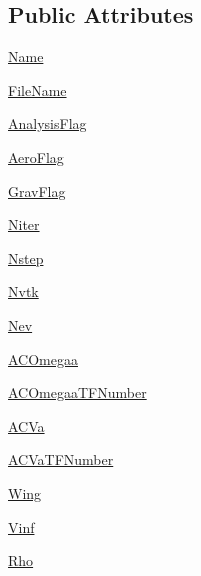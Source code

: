\subsection*{Public Attributes}
\begin{DoxyCompactItemize}
\item 
\hyperlink{classgebtaero_1_1_input_file_1_1_input_file_a87afcf626898dba8987e1cee7c4b4ed2}{Name}
\item 
\hyperlink{classgebtaero_1_1_input_file_1_1_input_file_a3bb9731a3c44faaf460cb16078183f92}{File\+Name}
\item 
\hyperlink{classgebtaero_1_1_input_file_1_1_input_file_a5e345411ff4b135151d46eaa96fd5b82}{Analysis\+Flag}
\item 
\hyperlink{classgebtaero_1_1_input_file_1_1_input_file_ad55254b6742bec2601372089bb1f96c4}{Aero\+Flag}
\item 
\hyperlink{classgebtaero_1_1_input_file_1_1_input_file_af8b6db9b44fda4dcd69858c0ae6675d2}{Grav\+Flag}
\item 
\hyperlink{classgebtaero_1_1_input_file_1_1_input_file_af663735f2e6dc4753c51e27ca4a7cbc6}{Niter}
\item 
\hyperlink{classgebtaero_1_1_input_file_1_1_input_file_af000cbafcaa45e8e55ad7e283f3fc10e}{Nstep}
\item 
\hyperlink{classgebtaero_1_1_input_file_1_1_input_file_a4cc370b4a5e05b66152449711685c0b8}{Nvtk}
\item 
\hyperlink{classgebtaero_1_1_input_file_1_1_input_file_ae7076931e907978fa63e151f549cc8ae}{Nev}
\item 
\hyperlink{classgebtaero_1_1_input_file_1_1_input_file_a17d270c516291f04138f9949ae9e6dd3}{A\+C\+Omegaa}
\item 
\hyperlink{classgebtaero_1_1_input_file_1_1_input_file_a6163d16b5322a7047dbe227ba5d390e0}{A\+C\+Omegaa\+T\+F\+Number}
\item 
\hyperlink{classgebtaero_1_1_input_file_1_1_input_file_af6abd7fc89c0f484e41fe96fc94e72ec}{A\+C\+Va}
\item 
\hyperlink{classgebtaero_1_1_input_file_1_1_input_file_adae1dff6c382e115473ad2b915854978}{A\+C\+Va\+T\+F\+Number}
\item 
\hyperlink{classgebtaero_1_1_input_file_1_1_input_file_aef106e7014301b5094f9ebd82637f282}{Wing}
\item 
\hyperlink{classgebtaero_1_1_input_file_1_1_input_file_aa219468b0f01af23063dbf55c5d40e1b}{Vinf}
\item 
\hyperlink{classgebtaero_1_1_input_file_1_1_input_file_a71105300fe8cf88253e38529768b998e}{Rho}

\end{DoxyCompactItemize}
